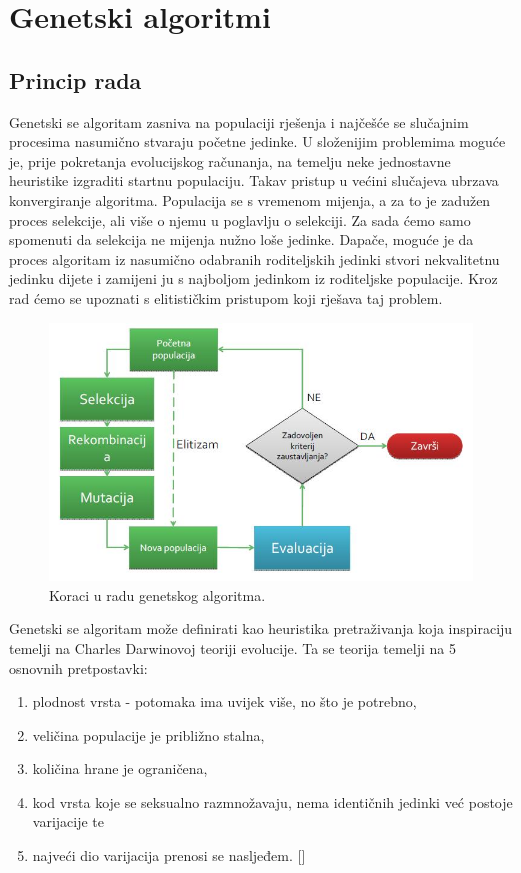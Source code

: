 \documentclass[times, utf8, zavrsni]{fer}
\begin{document}
	
	\chapter{Genetski algoritmi}
	
	\section{Princip rada}
	
	Genetski se algoritam zasniva na populaciji rješenja i najčešće se slučajnim procesima nasumično stvaraju početne jedinke. U složenijim problemima moguće je, prije pokretanja evolucijskog računanja, na temelju neke jednostavne heuristike izgraditi startnu populaciju. Takav pristup u većini slučajeva ubrzava konvergiranje algoritma. Populacija se s vremenom mijenja, a za to je zadužen proces selekcije, ali više o njemu u poglavlju o selekciji. Za sada ćemo samo spomenuti da selekcija ne mijenja nužno loše jedinke. Dapače, moguće je da proces algoritam iz nasumično odabranih roditeljskih jedinki stvori nekvalitetnu jedinku dijete i zamijeni ju s najboljom jedinkom iz roditeljske populacije. Kroz rad ćemo se upoznati s elitističkim pristupom koji rješava taj problem. \\
	
	\begin{figure}[!htb]
		\centering
		\includegraphics[width=15cm]{slike/genetskiGeneral.jpg}
		\caption{Koraci u radu genetskog algoritma. }
		\label{fig:genetic-general}
	\end{figure}
	
	Genetski se algoritam može definirati kao heuristika pretraživanja koja inspiraciju temelji na Charles Darwinovoj teoriji evolucije. Ta se teorija temelji na 5 osnovnih pretpostavki: 
	\begin{enumerate}
		\item plodnost vrsta - potomaka ima uvijek više, no što je potrebno,
		\item veličina populacije je približno stalna,
		\item količina hrane je ograničena,
		\item kod vrsta koje se seksualno razmnožavaju, nema identičnih jedinki već postoje varijacije te
		\item najveći dio varijacija prenosi se nasljeđem. [\citep{PIOA}]
		
	\end{enumerate}
	
\end{document}
